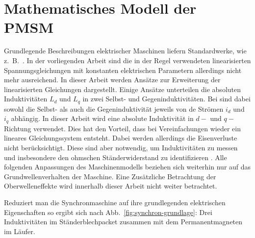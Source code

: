 \section{Mathematisches Modell der PMSM}\label{sec:math-pmsm}

Grundlegende Beschreibungen elektrischer Maschinen liefern Standardwerke, wie z.~B.\ \autocites{mullerII2008}{mullerI2005}{fischer2009}{schroder2000}.
In der vorliegenden Arbeit sind die in der Regel verwendeten linearisierten Spannungsgleichungen mit konstanten elektrischen Parametern allerdings nicht mehr ausreichend.
In dieser Arbeit werden Ansätze zur Erweiterung der linearisierten Gleichungen dargestellt.
Einige Ansätze unterteilen die absoluten Induktivitäten $L_d$ und $L_q$ in zwei Selbst- und Gegeninduktivitäten.
Bei \autocite{sturmberger} sind dabei sowohl die Selbst- als auch die Gegeninduktivität jeweils von de Strömen $i_d$ und $i_q$ abhängig.
In dieser Arbeit wird eine absolute Induktivität in $d-$ und $q-$Richtung verwendet.
Dies hat den Vorteil, dass bei Vereinfachungen wieder ein lineares Gleichungssystem entsteht.
Dabei werden allerdings die Eisenverluste nicht berücksichtigt.
Diese sind aber notwendig, um Induktivitäten zu messen und insbesondere den ohmschen Ständerwiderstand zu identifizieren \autocite{Kellner2012}.
Alle folgenden Anpassungen des Maschinenmodells beziehen sich weiterhin nur auf das Grundwellenverhalten der Maschine.
Eine Zusätzliche Betrachtung der Oberwelleneffekte wird innerhalb dieser Arbeit nicht weiter betrachtet.

Reduziert man die Synchronmaschine auf ihre grundlegenden elektrischen Eigenschaften so ergibt sich nach Abb.~\ref{fig:synchron-grundlage}: Drei Induktivitäten im Ständerblechpacket zusammen mit dem Permanentmagneten im Läufer.

